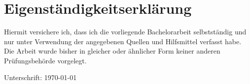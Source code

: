 \documentclass[11pt,a4paper]{article}
\begin{document}


\newpage




\listoftables
\listoffigures

\newpage
\section{Eigenständigkeitserklärung}
\noindent
Hiermit versichere ich, dass ich die vorliegende Bachelorarbeit selbstständig und nur unter Verwendung der angegebenen Quellen und Hilfsmittel verfasst habe. Die Arbeit wurde bisher in gleicher oder ähnlicher Form keiner anderen Prüfungsbehörde vorgelegt.

\vspace{30pt}
\noindent
Unterschrift: \hfill \today
\end{document}
